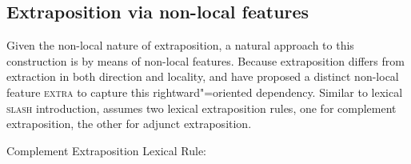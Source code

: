 \documentclass[output=paper
,notxmath 
 	        ,biblatex
                ,babelshorthands
                ,newtxmath
                ,draftmode
                ,colorlinks, citecolor=brown
]{langscibook}
\begin{document}
\subsection{Extraposition via non-local features}
\label{udc:sec-extra-feature}

Given the non-local nature of extraposition, a natural approach to
this construction is by means of non-local features. Because
extraposition differs from extraction in both direction and locality,
\citet{Keller:95} and \citet[Section~13.2]{Mueller99a}
have proposed a distinct non-local feature \textsc{extra} to capture
this rightward"=oriented dependency. 
Similar to lexical \textsc{slash} introduction, \citet[]{Keller:95} assumes two lexical
extraposition rules, one for  complement extraposition, the other for
adjunct extraposition. 



\ea
Complement Extraposition Lexical Rule:\\
\end{document}
